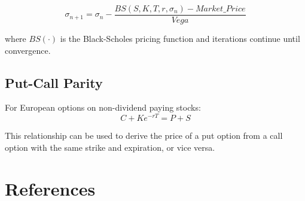 \documentclass{article}
\begin{document}
\begin{equation}
\sigma_{n+1} = \sigma_n - \frac{BS(S, K, T, r, \sigma_n) - Market\_Price}{Vega}
\end{equation}

where $BS(\cdot)$ is the Black-Scholes pricing function and iterations continue until convergence.

\subsection{Put-Call Parity}
For European options on non-dividend paying stocks:
\begin{equation}
C + Ke^{-rT} = P + S
\end{equation}

This relationship can be used to derive the price of a put option from a call option with the same strike and expiration, or vice versa.

\section{References}


\end{document}
